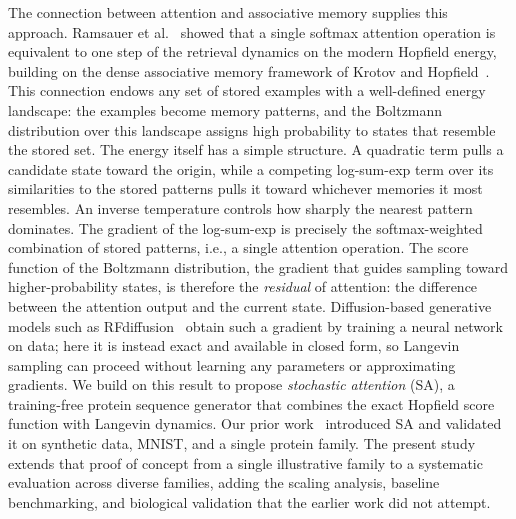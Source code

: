 \documentclass[11pt,onecolumn,twoside,lineno]{pnas-new}
\begin{document}
The connection between attention and associative memory supplies this approach. Ramsauer et al.~\cite{ramsauerHopfieldNetworksAll2021} showed that a single softmax attention operation is equivalent to one step of the retrieval dynamics on the modern Hopfield energy, building on the dense associative memory framework of Krotov and Hopfield~\cite{krotovDenseAssociativeMemory2016}. This connection endows any set of stored examples with a well-defined energy landscape: the examples become memory patterns, and the Boltzmann distribution over this landscape assigns high probability to states that resemble the stored set. The energy itself has a simple structure. A quadratic term pulls a candidate state toward the origin, while a competing log-sum-exp term over its similarities to the stored patterns pulls it toward whichever memories it most resembles. An inverse temperature controls how sharply the nearest pattern dominates. The gradient of the log-sum-exp is precisely the softmax-weighted combination of stored patterns, i.e., a single attention operation. The score function of the Boltzmann distribution, the gradient that guides sampling toward higher-probability states, is therefore the \emph{residual} of attention: the difference between the attention output and the current state. Diffusion-based generative models such as RFdiffusion~\cite{watsonRFdiffusion2023} obtain such a gradient by training a neural network on data; here it is instead exact and available in closed form, so Langevin sampling can proceed without learning any parameters or approximating gradients. We build on this result to propose \emph{stochastic attention} (SA), a training-free protein sequence generator that combines the exact Hopfield score function with Langevin dynamics. Our prior work~\cite{alswaidanVarnerStochasticAttention2026} introduced SA and validated it on synthetic data, MNIST, and a single protein family. The present study extends that proof of concept from a single illustrative family to a systematic evaluation across diverse families, adding the scaling analysis, baseline benchmarking, and biological validation that the earlier work did not attempt.
\end{document}
